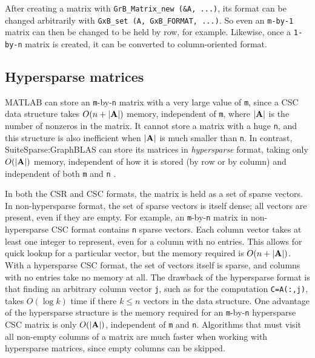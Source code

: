 \documentclass[12pt]{article}
\begin{document}
After creating a matrix with \verb'GrB_Matrix_new (&A, ...)',
its format can be changed arbitrarily with \verb'GxB_set (A, GxB_FORMAT, ...)'.
So even an \verb'm-by-1' matrix can then be changed to be held by row, for
example.  Likewise, once a \verb'1-by-n' matrix is created, it can be converted
to column-oriented format.

\subsection{Hypersparse matrices}
\label{hypersparse}

MATLAB can store an \verb'm'-by-\verb'n' matrix with a very large value of
\verb'm', since a CSC data structure takes $O(n+|{\bf A}|)$ memory, independent
of \verb'm', where $|{\bf A}|$ is the number of nonzeros in the matrix.  It
cannot store a matrix with a huge \verb'n', and this structure is also
inefficient when $|{\bf A}|$ is much smaller than \verb'n'.  In contrast,
SuiteSparse:GraphBLAS can store its matrices in {\em hypersparse} format,
taking only $O(|{\bf A}|)$ memory, independent of how it is stored (by row or
by column) and independent of both \verb'm' and \verb'n'
\cite{BulucGilbert08,BulucGilbert12}.

In both the CSR and CSC formats, the matrix is held as a set of sparse vectors.
In non-hypersparse format, the set of sparse vectors is itself dense; all
vectors are present, even if they are empty.  For example, an
\verb'm'-by-\verb'n' matrix in non-hypersparse CSC format contains \verb'n'
sparse vectors.  Each column vector takes at least one integer to represent,
even for a column with no entries.  This allows for quick lookup for a
particular vector, but the memory required is $O(n+|{\bf A}|)$.  With a
hypersparse CSC format, the set of vectors itself is sparse, and columns with
no entries take no memory at all.  The drawback of the hypersparse format is
that finding an arbitrary column vector \verb'j', such as for the computation
\verb'C=A(:,j)', takes $O(\log k)$ time if there $k \le n$ vectors in the data
structure.  One advantage of the hypersparse structure is the memory required
for an \verb'm'-by-\verb'n' hypersparse CSC matrix is only $O(|{\bf A}|)$,
independent of \verb'm' and \verb'n'.  Algorithms that must visit all non-empty
columns of a matrix are much faster when working with hypersparse matrices,
since empty columns can be skipped.
\end{document}
